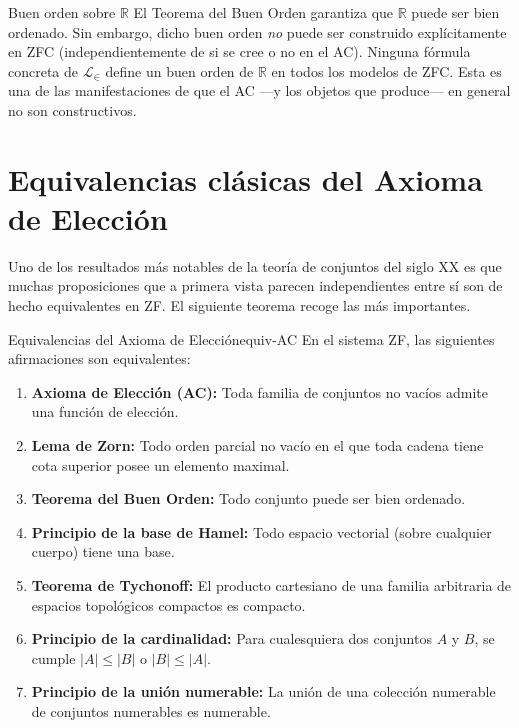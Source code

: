 \begin{ejemplo}{Buen orden sobre $\mathbb{R}$}{}
El Teorema del Buen Orden garantiza que $\mathbb{R}$ puede ser bien ordenado. Sin embargo, dicho buen orden \emph{no} puede ser construido explícitamente en ZFC (independientemente de si se cree o no en el AC). Ninguna fórmula concreta de $\mathcal{L}_{\in}$ define un buen orden de $\mathbb{R}$ en todos los modelos de ZFC. Esta es una de las manifestaciones de que el AC —y los objetos que produce— en general no son constructivos.
\end{ejemplo}

\section{Equivalencias clásicas del Axioma de Elección}

Uno de los resultados más notables de la teoría de conjuntos del siglo XX es que muchas proposiciones que a primera vista parecen independientes entre sí son de hecho equivalentes en ZF. El siguiente teorema recoge las más importantes.

\begin{teorema}{Equivalencias del Axioma de Elección}{equiv-AC}
En el sistema ZF, las siguientes afirmaciones son equivalentes:
\begin{enumerate}[leftmargin=2em, label=\textbf{(\roman*)}]
  \item \textbf{Axioma de Elección (AC):} Toda familia de conjuntos no vacíos admite una función de elección.
  \item \textbf{Lema de Zorn:} Todo orden parcial no vacío en el que toda cadena tiene cota superior posee un elemento maximal.
  \item \textbf{Teorema del Buen Orden:} Todo conjunto puede ser bien ordenado.
  \item \textbf{Principio de la base de Hamel:} Todo espacio vectorial (sobre cualquier cuerpo) tiene una base.
  \item \textbf{Teorema de Tychonoff:} El producto cartesiano de una familia arbitraria de espacios topológicos compactos es compacto.
  \item \textbf{Principio de la cardinalidad:} Para cualesquiera dos conjuntos $A$ y $B$, se cumple $|A| \leq |B|$ o $|B| \leq |A|$.
  \item \textbf{Principio de la unión numerable:} La unión de una colección numerable de conjuntos numerables es numerable.
\end{enumerate}
\end{teorema}

